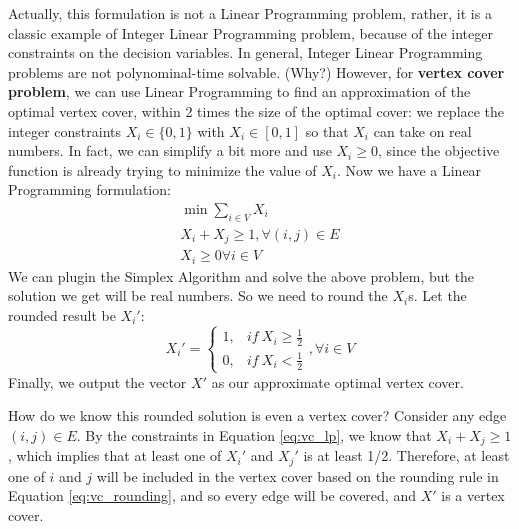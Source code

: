 \documentclass{article}
\begin{document}
Actually, this formulation is not a Linear Programming problem, rather, it is
a classic example of Integer Linear Programming problem, because of the integer
constraints on the decision variables.
In general, Integer Linear Programming problems are not polynominal-time
solvable. (Why?) However, for {\bf vertex cover problem}, we can use Linear
Programming to find an approximation of the optimal vertex cover, within 2 times
the size of the optimal cover: 
we replace the integer constraints $X_i \in \{0,1\}$
with $X_i \in [0, 1]$ so that $X_i$ can take on real numbers.
In fact, we can simplify a bit more and use $X_i \ge 0$, since the objective
function is already trying to minimize the value of $X_i$.
Now we have a Linear Programming formulation:
\begin{equation}
\label{eq:vc_lp}
\begin{split}
	\min \sum_{i \in V} X_i\\
	X_i + X_j \ge 1, \forall (i, j) \in E\\
	X_i \ge 0 \forall i \in V
\end{split}
\end{equation}
We can plugin the Simplex Algorithm and solve the above problem, but the
solution we get will be real numbers. So we need to round the $X_i$s.
Let the rounded result be $X_i'$:
\begin{equation}
\label{eq:vc_rounding}
	X_i' = \left\{\begin{matrix}
		1, & if~X_i \ge \frac{1}{2}\\ 
		0, & if~X_i < \frac{1}{2}
	\end{matrix}\right., 
	\forall i \in V
\end{equation}
Finally, we output the vector $X'$ as our approximate optimal vertex cover.

How do we know this rounded solution is even a vertex cover? Consider any edge 
$(i,j) \in E$. By the constraints in Equation \ref{eq:vc_lp}, we know that
$X_i + X_j \ge 1$, which implies that at least one of $X_i'$ and $X_j'$ is
at least 1/2. Therefore, at least one of $i$ and $j$ will be included in the
vertex cover based on the rounding rule in Equation \ref{eq:vc_rounding}, 
and so every edge will be covered, and $X'$ is a vertex cover.
\end{document}
